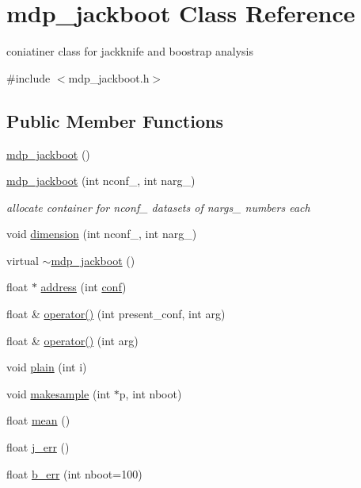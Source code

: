 \hypertarget{classmdp__jackboot}{
\section{mdp\_\-jackboot Class Reference}
\label{classmdp__jackboot}
}


coniatiner class for jackknife and boostrap analysis  


{\ttfamily \#include $<$mdp\_\-jackboot.h$>$}\subsection*{Public Member Functions}
\begin{DoxyCompactItemize}
\item 
\hyperlink{classmdp__jackboot_a7cb2ed899f90ecc23bd0a4eecf15e8d9}{mdp\_\-jackboot} ()
\item 
\hyperlink{classmdp__jackboot_a528121e64281ffc30843b720f7c6354a}{mdp\_\-jackboot} (int nconf\_\-, int narg\_)
\begin{DoxyCompactList}\small\item\em allocate container for nconf\_\- datasets of nargs\_\- numbers each \item\end{DoxyCompactList}\item 
void \hyperlink{classmdp__jackboot_a452de46122e421b055d02c381fc88c58}{dimension} (int nconf\_\-, int narg\_)
\item 
virtual \hyperlink{classmdp__jackboot_aff3993d59a2c97e449e79da8dfdbbe86}{$\sim$mdp\_\-jackboot} ()
\item 
float $\ast$ \hyperlink{classmdp__jackboot_a0eac202baa5532ede856af6f616ab9d9}{address} (int \hyperlink{classmdp__jackboot_ae84ce36555fb3089989232ca91d80e15}{conf})
\item 
float \& \hyperlink{classmdp__jackboot_a7533621a114d565f0c26bcc3ca0df1bb}{operator()} (int present\_\-conf, int arg)
\item 
float \& \hyperlink{classmdp__jackboot_a1bfb073e7933a0ff34d8f50743e1d695}{operator()} (int arg)
\item 
void \hyperlink{classmdp__jackboot_a56e5206388f943a9fee3d4d2eea3b2ae}{plain} (int i)
\item 
void \hyperlink{classmdp__jackboot_add5b0171b18a4befe8e526aaf5b30477}{makesample} (int $\ast$p, int nboot)
\item 
float \hyperlink{classmdp__jackboot_ae1d3c643754c88be40ac1957ac4db685}{mean} ()
\item 
float \hyperlink{classmdp__jackboot_aa594e64f4e7155684e2d23f1f7ba2b5d}{j\_\-err} ()
\item 
float \hyperlink{classmdp__jackboot_a4d4841252e62815d7242cb440c6e49c0}{b\_\-err} (int nboot=100)
\end{DoxyCompactItemize}

